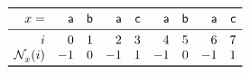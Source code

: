 \documentclass[11pt]{article}
\begin{document}
\TeXtoEPS
\(
\begin{array}{rrrrrrrrr}
\toprule
  x = & \word{a} & \word{b} & \word{a} & \word{c}
      & \word{a} & \word{b} & \word{a} & \word{c}\\
\midrule
  i &  0 & 1 & 2  & 3 & 4  & 5 & 6  & 7\\
  \MPfailure{x}{}{i}
    & -1 & 0 & -1 & 1 & -1 & 0 & -1 & 1\\
\bottomrule
\end{array}
\)
\endTeXtoEPS
\end{document}
